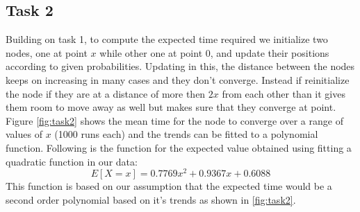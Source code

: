 \documentclass[answers]{exam}
\begin{document}
\subsection {Task 2}
\begin{solution}
    Building on task 1, to compute the expected time required we initialize two nodes, one at point $x$ while other one at point $0$, and update their positions according to given probabilities. Updating in this, the distance between the nodes keeps on increasing in many cases and they don't converge. Instead if reinitialize the node if they are at a distance of more then $2x$ from each other than it gives them room to move away as well but makes sure that they converge at point. Figure \ref{fig:task2} shows the mean time for the node to converge over a range of values of $x$ (1000 runs each) and the trends can be fitted to a polynomial function. Following is the function for the expected value obtained using fitting a quadratic function in our data:
    \[E[X=x]=0.7769x^2+0.9367x+0.6088\]
    This function is based on our assumption that the expected time would be a second order polynomial based on it's trends as shown in \ref{fig:task2}.
\end{solution}
\end{document}
